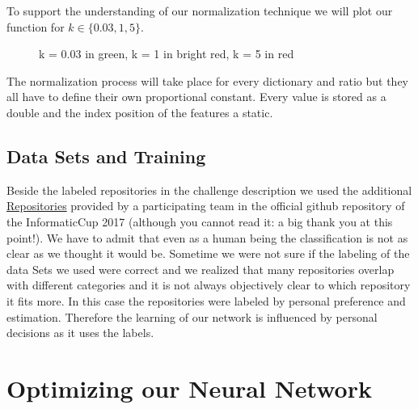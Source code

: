 \documentclass[paper=A4,pagesize=auto,12pt,headinclude=true,footinclude=true,BCOR=0mm,DIV=calc]{scrartcl}
\begin{document}
To support the understanding of our normalization technique we will plot our function for $k \in \{0.03, 1, 5\}$.\\
\begin{figure}[H]
	\caption{k = 0.03 in green, k = 1 in bright red, k = 5 in red}
\end{figure}

The normalization process will take place for every dictionary and ratio but they all have to define their own proportional constant.
Every value is stored as a double and the index position of the features a static.




	
	\subsection{Data Sets and Training}
	Beside the labeled repositories in the challenge description we used the additional \hyperref[src:Repositories]{Repositories} provided by a participating team in the official github repository of the InformaticCup 2017 (although you cannot read it: a big thank you at this point!). We have to admit that even as a human being the classification is not as clear as we thought it would be. Sometime we were not sure if the labeling of the data Sets we used were correct and we realized that many repositories overlap with different categories and it is not always objectively clear to which repository it fits more. In this case the repositories were labeled by personal preference and estimation. Therefore the learning of our network is influenced by personal decisions as it uses the labels.
	\section{Optimizing our Neural Network }
\end{document}
